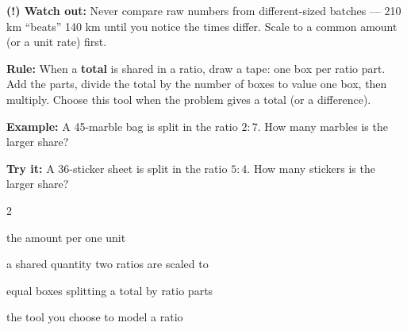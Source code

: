 \documentclass[12pt]{article}
\begin{document}
\begin{watchoutbox}
\textbf{(!) Watch out:} Never compare raw numbers from different-sized batches
— 210 km ``beats'' 140 km until you notice the times differ. Scale to a common
amount (or a unit rate) first.
\end{watchoutbox}


\begin{formulabox}
\textbf{Rule:} When a \textbf{total} is shared in a ratio, draw a tape: one box
per ratio part. Add the parts, divide the total by the number of boxes to value
one box, then multiply. Choose this tool when the problem gives a total (or a
difference).
\end{formulabox}

\begin{examplebox}
\textbf{Example:} \quad A 45-marble bag is split in the ratio $2{:}7$. How many
marbles is the larger share?
\end{examplebox}

\begin{tryitbox}
\textbf{Try it:} \quad A 36-sticker sheet is split in the ratio $5{:}4$. How
many stickers is the larger share?\\[2pt]
\end{tryitbox}

\vspace{0.3cm}

\begin{multicols}{2}
\begin{description}[leftmargin=0.5cm, itemsep=2pt, font=\normalfont\bfseries]
  \item[Unit rate:] the amount per one unit
  \item[Common amount:] a shared quantity two ratios are scaled to
  \item[Tape diagram:] equal boxes splitting a total by ratio parts
  \item[Representation:] the tool you choose to model a ratio
\end{description}
\end{multicols}
\end{document}
